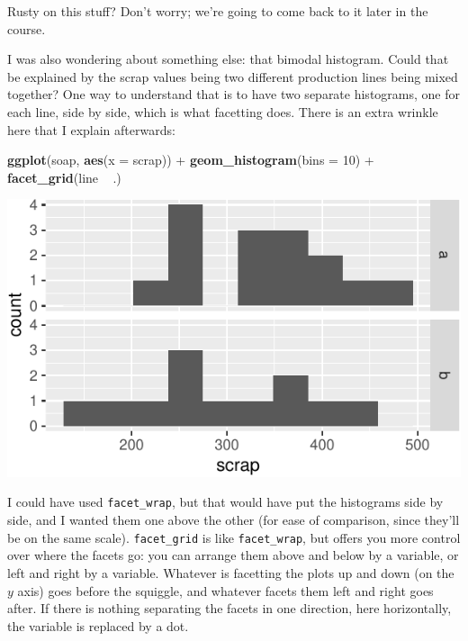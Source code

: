 \documentclass[]{tufte-book}
\newenvironment{Shaded}{}{}
\newcommand{\DataTypeTok}[1]{\textcolor[rgb]{0.56,0.13,0.00}{#1}}
\newcommand{\DecValTok}[1]{\textcolor[rgb]{0.25,0.63,0.44}{#1}}
\newcommand{\KeywordTok}[1]{\textcolor[rgb]{0.00,0.44,0.13}{\textbf{#1}}}
\newcommand{\NormalTok}[1]{#1}
\newcommand{\OperatorTok}[1]{\textcolor[rgb]{0.40,0.40,0.40}{#1}}
\newcommand{\StringTok}[1]{\textcolor[rgb]{0.25,0.44,0.63}{#1}}
\theoremstyle{definition}
\theoremstyle{definition}
\theoremstyle{definition}
\theoremstyle{remark}
\begin{document}
Rusty on this stuff? Don't worry; we're going to come back to it later
in the course.

I was also wondering about something else: that bimodal histogram. Could
that be explained by the scrap values being two different production
lines being mixed together? One way to understand that is to have two
separate histograms, one for each line, side by side, which is what
facetting does. There is an extra wrinkle here that I explain
afterwards:

\begin{Shaded}
\begin{Highlighting}[]
\KeywordTok{ggplot}\NormalTok{(soap, }\KeywordTok{aes}\NormalTok{(}\DataTypeTok{x =}\NormalTok{ scrap)) }\OperatorTok{+}\StringTok{ }\KeywordTok{geom_histogram}\NormalTok{(}\DataTypeTok{bins =} \DecValTok{10}\NormalTok{) }\OperatorTok{+}\StringTok{ }
\StringTok{    }\KeywordTok{facet_grid}\NormalTok{(line }\OperatorTok{~}\StringTok{ }\NormalTok{.)}
\end{Highlighting}
\end{Shaded}

\includegraphics{02-reading-in_files/figure-latex/unnamed-chunk-15-1}

I could have used \texttt{facet\_wrap}, but that would have put the
histograms side by side, and I wanted them one above the other (for ease
of comparison, since they'll be on the same scale). \texttt{facet\_grid}
is like \texttt{facet\_wrap}, but offers you more control over where the
facets go: you can arrange them above and below by a variable, or left
and right by a variable. Whatever is facetting the plots up and down (on
the \(y\) axis) goes before the squiggle, and whatever facets them left
and right goes after. If there is nothing separating the facets in one
direction, here horizontally, the variable is replaced by a dot.
\end{document}
